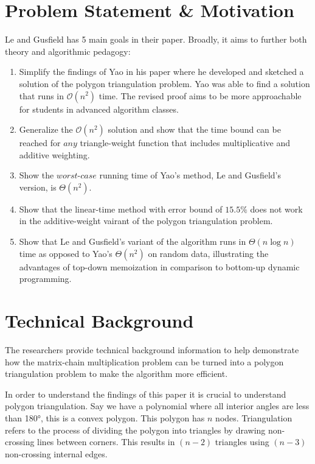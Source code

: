 \documentclass[12pt]{article}
\begin{document}
\section{Problem Statement \& Motivation}

Le and Gusfield has 5 main goals in their paper. Broadly, it aims to further both theory and algorithmic pedagogy:
\begin{enumerate}
    \item Simplify the findings of Yao in his paper where he developed and sketched a solution of the polygon triangulation problem. Yao was able to find a solution that runs in $\mathcal{O}(n^2)$ time. The revised proof aims to be more approachable for students in advanced algorithm classes.
    \item Generalize the $\mathcal{O}(n^2)$ solution and show that the time bound can be reached for $\textit{any}$ triangle-weight function that includes multiplicative and additive weighting.
    \item Show the $\textit{worst-case}$ running time of Yao's method, Le and Gusfield's version, is $\Theta(n^2)$.
    \item Show that the linear-time method with error bound of $15.5\%$ does not work in the additive-weight vairant of the polygon triangulation problem.
    \item Show that Le and Gusfield's variant of the algorithm runs in $\Theta(n \log n)$ time as opposed to Yao's $\Theta(n^2)$ on random data, illustrating the advantages of top-down memoization in comparison to bottom-up dynamic programming.
\end{enumerate}

\section{Technical Background}

The researchers provide technical background information to help demonstrate how the matrix-chain multiplication problem can be turned into a polygon triangulation problem to make the algorithm more efficient. 



In order to understand the findings of this paper it is crucial to understand polygon triangulation. Say we have a polynomial where all interior angles are less than 180°, this is a convex polygon. This polygon has $n$ nodes. Triangulation refers to the process of dividing the polygon into triangles by drawing non-crossing lines between corners. This results in $(n-2)$ triangles using $(n-3)$ non-crossing internal edges.
\end{document}
